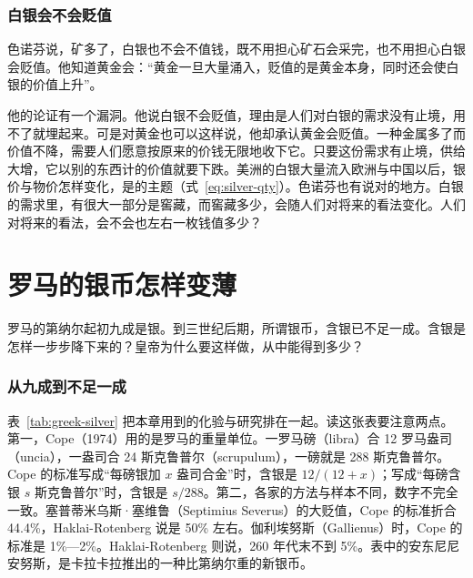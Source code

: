 \subsubsection{白银会不会贬值}
色诺芬说，矿多了，白银也不会不值钱，既不用担心矿石会采完，也不用担心白银会贬值。他知道黄金会：“黄金一旦大量涌入，贬值的是黄金本身，同时还会使白银的价值上升”\cite{xenrev}。

他的论证有一个漏洞。他说白银不会贬值，理由是人们对白银的需求没有止境，用不了就埋起来。可是对黄金也可以这样说，他却承认黄金会贬值。一种金属多了而价值不降，需要人们愿意按原来的价钱无限地收下它。只要这份需求有止境，供给大增，它以别的东西计的价值就要下跌。美洲的白银大量流入欧洲与中国以后，银价与物价怎样变化，是的主题（式~\eqref{eq:silver-qty}）。色诺芬也有说对的地方。白银的需求里，有很大一部分是窖藏，而窖藏多少，会随人们对将来的看法变化。人们对将来的看法，会不会也左右一枚钱值多少？

\section{罗马的银币怎样变薄}\label{sec:greek-denarius}

罗马的第纳尔起初九成是银。到三世纪后期，所谓银币，含银已不足一成。含银是怎样一步步降下来的？皇帝为什么要这样做，从中能得到多少？

\subsubsection{从九成到不足一成}
表~\ref{tab:greek-silver} 把本章用到的化验与研究排在一起。读这张表要注意两点。第一，Cope（1974）用的是罗马的重量单位。一罗马磅（libra）合 12 罗马盎司（uncia）\cite{kent1920}，一盎司合 24 斯克鲁普尔（scrupulum）\cite{cope1974}，一磅就是 288 斯克鲁普尔。Cope 的标准写成“每磅银加 $x$ 盎司合金”时，含银是 $12/(12+x)$；写成“每磅含银 $s$ 斯克鲁普尔”时，含银是 $s/288$。第二，各家的方法与样本不同，数字不完全一致。塞普蒂米乌斯·塞维鲁（Septimius Severus）的大贬值，Cope 的标准折合 44.4\%，Haklai-Rotenberg 说是 50\% 左右。伽利埃努斯（Gallienus）时，Cope 的标准是 1\%—2\%。Haklai-Rotenberg 则说，260 年代末不到 5\%。表中的安东尼尼安努斯，是卡拉卡拉推出的一种比第纳尔重的新银币。

